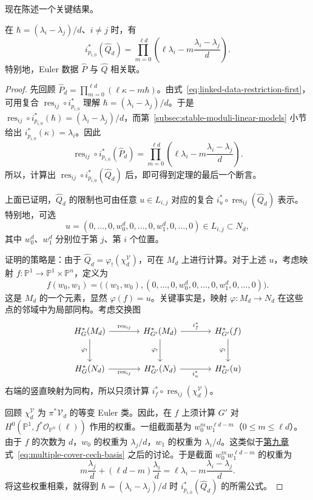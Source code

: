 现在陈述一个关键结果。
\begin{theorem}\label{thm:linked-geometric-hypergeometric-data}
在 $\hbar=(\lambda_i-\lambda_j)/d$、$i\ne j$ 时，有
\[
i_{p_{i,0}}^*(\widehat Q_d)
=\prod_{m=0}^{\ell d}\left(\ell\lambda_i-m\frac{\lambda_i-\lambda_j}{d}\right).
\]
特别地，Euler 数据 $\widehat P$ 与 $\widehat Q$ 相关联。
\end{theorem}
\begin{proof}
先回顾 $\widehat P_d=\prod_{m=0}^{\ell d}(\ell\kappa-m\hbar)$。由式~\eqref{eq:linked-data-restriction-first}，可用复合 $\operatorname{res}_{ij}\circ i_{p_{i,0}}^*$ 理解 $\hbar=(\lambda_i-\lambda_j)/d$。于是 $\operatorname{res}_{ij}\circ i_{p_{i,0}}^*(\hbar)=(\lambda_i-\lambda_j)/d$，而第~\ref{subsec:stable-moduli-linear-models} 小节给出 $i_{p_{i,0}}^*(\kappa)=\lambda_i$。因此
\[
\operatorname{res}_{ij}\circ i_{p_{i,0}}^*(\widehat P_d)
=\prod_{m=0}^{\ell d}\left(\ell\lambda_i-m\frac{\lambda_i-\lambda_j}{d}\right).
\]
所以，计算出 $\operatorname{res}_{ij}\circ i_{p_{i,0}}^*(\widehat Q_d)$ 后，即可得到定理的最后一个断言。

上面已证明，$\widehat Q_d$ 的限制也可由任意 $u\in L_{i,j}$ 对应的复合 $i_u^*\circ\operatorname{res}_{ij}(\widehat Q_d)$ 表示。特别地，可选
\[
u=(0,\ldots,0,w_0^d,0,\ldots,0,w_1^d,0,\ldots,0)\in L_{i,j}\subset N_d,
\]
其中 $w_0^d$、$w_1^d$ 分别位于第 $j$、第 $i$ 个位置。

证明的策略是：由于 $\widehat Q_d=\varphi_!(\chi_d^{\mathcal V})$，可在 $M_d$ 上进行计算。对于上述 $u$，考虑映射 $f:\mathbb P^1\to\mathbb P^1\times\mathbb P^n$，定义为
\[
f(w_0,w_1)=\bigl((w_1,w_0),
(0,\ldots,0,w_0^d,0,\ldots,0,w_1^d,0,\ldots,0)\bigr).
\]
这是 $M_d$ 的一个元素，显然 $\varphi(f)=u$。关键事实是，映射 $\varphi:M_d\to N_d$ 在这些点的邻域中为局部同构。考虑交换图
\[
\begin{tikzcd}[column sep=large,row sep=large]
H_G^*(M_d)\arrow[r,"\operatorname{res}_{ij}"]\arrow[d,"\varphi_!"']&H_{G'}^*(M_d)\arrow[r,"i_f^*"]\arrow[d,"\varphi_!"']&H_{G'}^*(f)\arrow[d,"\varphi_!"']\\
H_G^*(N_d)\arrow[r,"\operatorname{res}_{ij}"']&H_{G'}^*(N_d)\arrow[r,"i_u^*"']&H_{G'}^*(u)
\end{tikzcd}
\]
右端的竖直映射为同构，所以只须计算 $i_f^*\circ\operatorname{res}_{ij}(\chi_d^{\mathcal V})$。

回顾 $\chi_d^{\mathcal V}$ 为 $\pi^*\mathcal V_d$ 的等变 Euler 类。因此，在 $f$ 上须计算 $G'$ 对 $H^0(\mathbb P^1,f^*\mathcal O_{\mathbb P^n}(\ell))$ 作用的权重。一组截面基为 $w_0^mw_1^{\ell d-m}$（$0\le m\le\ell d$）。由于 $f$ 的次数为 $d$，$w_0$ 的权重为 $\lambda_j/d$，$w_1$ 的权重为 $\lambda_i/d$。这类似于\hyperref[chap:localization]{第九章}式~\eqref{eq:multiple-cover-cech-basis} 之后的讨论。于是截面 $w_0^mw_1^{\ell d-m}$ 的权重为
\[
m\frac{\lambda_j}d+(\ell d-m)\frac{\lambda_i}d
=\ell\lambda_i-m\frac{\lambda_i-\lambda_j}d.
\]
将这些权重相乘，就得到 $\hbar=(\lambda_i-\lambda_j)/d$ 时 $i_{p_{i,0}}^*(\widehat Q_d)$ 的所需公式。
\end{proof}

